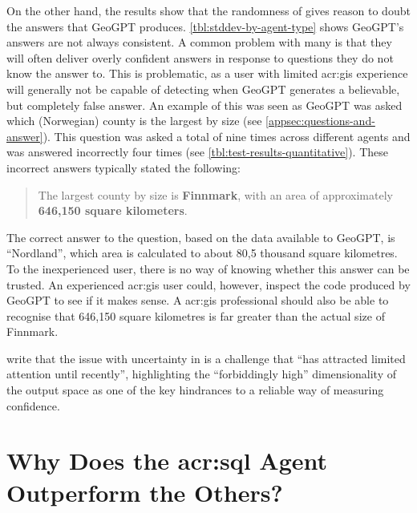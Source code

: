 On the other hand, the results show that the randomness of  gives reason to doubt the answers that GeoGPT produces. \autoref{tbl:stddev-by-agent-type} shows GeoGPT's answers are not always consistent. A common problem with many  is that they will often deliver overly confident answers in response to questions they do not know the answer to. This is problematic, as a user with limited \acrshort{acr:gis} experience will generally not be capable of detecting when GeoGPT generates a believable, but completely false answer. An example of this was seen as GeoGPT was asked  which (Norwegian) county is the largest by size (see \autoref{appsec:questions-and-answer}). This question was asked a total of nine times across different agents and was answered incorrectly four times (see \autoref{tbl:test-results-quantitative}). These incorrect answers typically stated the following:

\begin{quote}
    The largest county by size is \textbf{Finnmark}, with an area of approximately \textbf{646,150 square kilometers}.
\end{quote}

The correct answer to the question, based on the data available to GeoGPT, is \enquote{Nordland}, which area is calculated to about 80,5 thousand square kilometres. To the inexperienced user, there is no way of knowing whether this answer can be trusted. An experienced \acrshort{acr:gis} user could, however, inspect the code produced by GeoGPT to see if it makes sense. A \acrshort{acr:gis} professional should also be able to recognise that 646,150 square kilometres is far greater than the actual size of Finnmark.

\cite[1-2]{linGeneratingConfidenceUncertainty2023} write that the issue with uncertainty in  is a challenge that \enquote{has attracted limited attention until recently}, highlighting the \enquote{forbiddingly high} dimensionality of the output space as one of the key hindrances to a reliable way of measuring confidence.



\section[Why Does the SQL Agent Outperform the Others?]{Why Does the \acrshort{acr:sql} Agent Outperform the Others?}
\label{sec:why-sql-better}

